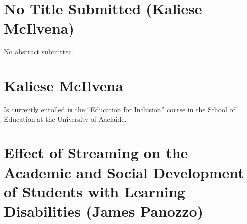 \documentclass[twoside,14pt,a4paper,notitlepage]{memoir}
\begin{document}
\section*{No Title Submitted (Kaliese McIlvena)}
\label{aut:mcilvena}

No abstract submitted.

\section*{Kaliese McIlvena}

Is currently enrolled in the ``Education for Inclusion'' course in the School of Education at the University of Adelaide.



\section*{Effect of Streaming on the Academic and Social Development of Students with Learning Disabilities (James Panozzo)}
\label{aut:panozzo}
\end{document}

